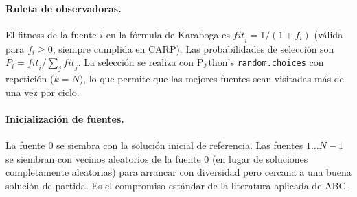 \documentclass[12pt, a4paper]{article}
\begin{document}
\paragraph{Ruleta de observadoras.}
El fitness de la fuente $i$ en la fórmula de Karaboga es $\mathit{fit}_i = 1/(1 + f_i)$
(válida para $f_i \geq 0$, siempre cumplida en CARP). Las probabilidades de
selección son $P_i = \mathit{fit}_i / \sum_j \mathit{fit}_j$. La selección se
realiza con Python's \texttt{random.choices} con repetición ($k = N$), lo que
permite que las mejores fuentes sean visitadas más de una vez por ciclo.

\paragraph{Inicialización de fuentes.}
La fuente 0 se siembra con la solución inicial de referencia. Las fuentes
$1 \ldots N-1$ se siembran con vecinos aleatorios de la fuente 0 (en lugar de
soluciones completamente aleatorias) para arrancar con diversidad pero cercana
a una buena solución de partida. Es el compromiso estándar de la literatura
aplicada de ABC.
\end{document}
